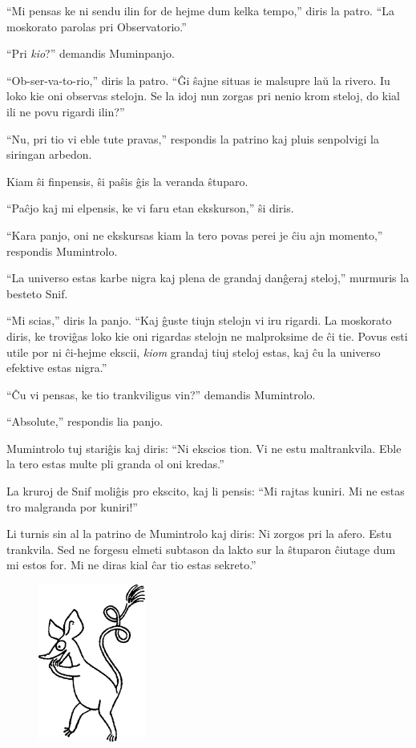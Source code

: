 ``Mi pensas ke ni sendu ilin for de hejme dum kelka tempo,'' diris la patro. ``La moskorato parolas pri Observatorio.''

``Pri \emph{kio}?'' demandis Muminpanjo.

``Ob-ser-va-to-rio,'' diris la patro. ``Ĝi ŝajne situas ie malsupre laŭ la rivero. Iu loko kie oni observas stelojn. Se la idoj nun zorgas pri nenio krom steloj, do kial ili ne povu rigardi ilin?''

``Nu, pri tio vi eble tute pravas,'' respondis la patrino kaj pluis senpolvigi la siringan arbedon.

Kiam ŝi finpensis, ŝi paŝis ĝis la veranda ŝtuparo.

``Paĉjo kaj mi elpensis, ke vi faru etan ekskurson,'' ŝi diris.

``Kara panjo, oni ne ekskursas kiam la tero povas perei je ĉiu ajn momento,'' respondis Mumintrolo.

``La universo estas karbe nigra kaj plena de grandaj danĝeraj steloj,'' murmuris la besteto Snif.

``Mi scias,'' diris la panjo. ``Kaj ĝuste tiujn stelojn vi iru rigardi. La moskorato diris, ke troviĝas loko kie oni rigardas stelojn ne malproksime de ĉi tie. Povus esti utile por ni ĉi-hejme ekscii, \emph{kiom} grandaj tiuj steloj estas, kaj ĉu la universo efektive estas nigra.''

``Ĉu vi pensas, ke tio trankviligus vin?'' demandis Mumintrolo.

``Absolute,'' respondis lia panjo.

Mumintrolo tuj stariĝis kaj diris: ``Ni ekscios tion. Vi ne estu maltrankvila. Eble la tero estas multe pli granda ol oni kredas.''

La kruroj de Snif moliĝis pro ekscito, kaj li pensis: ``Mi rajtas kuniri. Mi ne estas tro malgranda por kuniri!''

Li turnis sin al la patrino de Mumintrolo kaj diris: Ni zorgos pri la afero. Estu trankvila. Sed ne forgesu elmeti subtason da lakto sur la ŝtuparon ĉiutage dum mi estos for. Mi ne diras kial ĉar tio estas sekreto.''

\begin{figure}[htbp]
\centering
\includegraphics[width=100pt,height=147pt]{2-3.png}
\caption{}
\label{2-3}
\end{figure}

